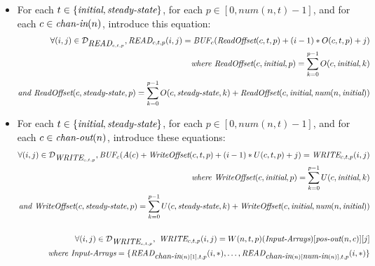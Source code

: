 \begin{itemize}
\item For each $t \in \{\mbox{\it initial}, \mbox{\it steady-state}\}$, for each
$p \in [0, num(n, t)-1]$, and for each $c \in \mbox{\it chan-in}(n)$,
introduce this equation:
\begin{align*}
\forall (i,j) \in {\cal D}_{\mbox{\it READ}_{c,t,p}}, \mbox{\it READ}_{c, t, p}(i, j) = \mbox{\it BUF}_{c}(\mbox{\it ReadOffset}(c,t,p) + (i-1)*O(c, t, p) + j) \\
\mbox{\it where ReadOffset}(c,\mbox{\it initial},p) = \sum_{k=0}^{p-1} O(c, \mbox{\it initial}, k)\\ \mbox{\it and ReadOffset}(c, \mbox{\it steady-state}, p) = \sum_{k=0}^{p-1} O(c, \mbox{\it steady-state}, k) + \mbox{\it ReadOffset}(c,\mbox{\it initial},\mbox{\it num}(n,\mbox{\it initial}))
\end{align*}
\item For each $t \in \{\mbox{\it initial}, \mbox{\it steady-state}\}$, for each
$p \in [0, num(n, t)-1]$, and for each $c \in \mbox{\it chan-out}(n)$,
introduce these equations:
\begin{align*}
\forall (i,j) \in {\cal D}_{\mbox{\it WRITE}_{c,t,p}}, \mbox{\it BUF}_{c}(A(c) + \mbox{\it WriteOffset}(c,t,p) + (i-1)*U(c, t, p) + j) = \mbox{\it WRITE}_{c, t, p}(i, j) \\ \mbox{\it where WriteOffset}(c,\mbox{\it initial},p) = \sum_{k=0}^{p-1} U(c, \mbox{\it initial}, k)\\ \mbox{\it and WriteOffset}(c, \mbox{\it steady-state}, p) = \sum_{k=0}^{p-1} U(c, \mbox{\it steady-state}, k) + \mbox{\it WriteOffset}(c,\mbox{\it initial},\mbox{\it num}(n,\mbox{\it initial})) \\ ~ \\
\forall (i, j) \in {\cal D}_{\mbox{\it WRITE}_{c, t, p}},~\mbox{\it WRITE}_{c,t,p}(i,j) = W(n, t, p)(\mbox{\it Input-Arrays})[\mbox{\it pos-out}(n, c)][j] \\
\mbox{\it where Input-Arrays} = \{\mbox{\it READ}_{\mbox{\it chan-in}(n)[1], t, p}(i, *), \dots, \mbox{\it READ}_{\mbox{\it chan-in}(n)[\mbox{\it num-in}(n)], t, p}(i, *) \}
\end{align*}
\end{itemize}






